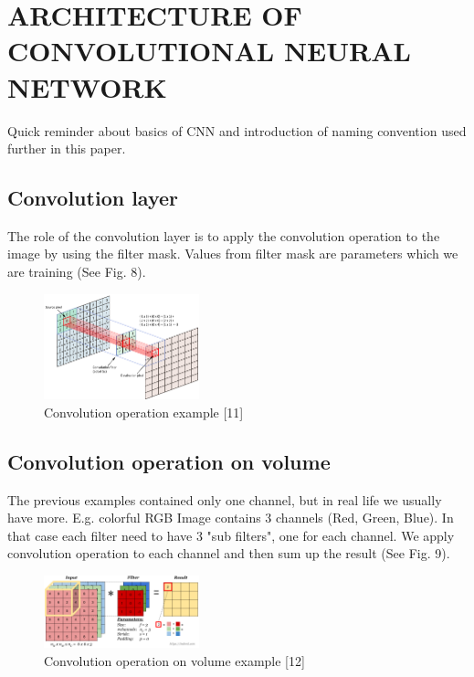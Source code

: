 \documentclass[letterpaper, 10 pt, conference]{ieeeconf}  %
\begin{document}
\section{ARCHITECTURE OF CONVOLUTIONAL NEURAL NETWORK}
Quick reminder about basics of CNN and introduction of naming convention used further in this paper.

\subsection{Convolution layer}
The role of the convolution layer is to apply the convolution operation to the image by using the filter mask. Values from filter mask are parameters which we are training (See Fig. 8). 

\begin{figure}[ht]
	\centering
    \includegraphics[width=0.4\textwidth]{Pictures/ConvolutionLayer.png}
	\caption{Convolution operation example [11]}
\end{figure}

\subsection{Convolution operation on volume}

The previous examples contained only one channel, but in real life we usually have more. E.g. colorful RGB Image contains 3 channels (Red, Green, Blue). In that case each filter need to have 3 "sub filters", one for each channel. We apply convolution operation to each channel and then sum up the result (See Fig. 9).  

\begin{figure}[h]
	\centering
    \includegraphics[width=0.4\textwidth]{Pictures/convolution-operation-on-volume5.png}
	\caption{Convolution operation on volume example [12]}
\end{figure}
\end{document}
